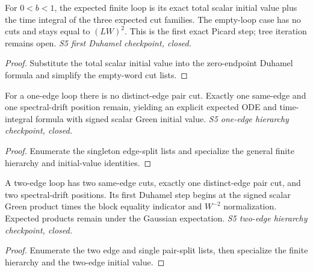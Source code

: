 \begin{lemma}
  \label{lem:loop-hierarchy-first-duhamel}
  \leanok
  For $0<b<1$, the expected finite loop is its exact total scalar initial
  value plus the time integral of the three expected cut families. The
  empty-loop case has no cuts and stays equal to $(LW)^2$. This is the
  first exact Picard step; tree iteration remains open.
  \emph{S5 first Duhamel checkpoint, closed.}
\end{lemma}
\begin{proof}\leanok
  Substitute the total scalar initial value into the zero-endpoint
  Duhamel formula and simplify the empty-word cut lists.
\end{proof}

\begin{lemma}
  \label{lem:loop-hierarchy-one-edge}
  \leanok
  For a one-edge loop there is no distinct-edge pair cut. Exactly one
  same-edge and one spectral-drift position remain, yielding an explicit
  expected ODE and time-integral formula with signed scalar Green initial
  value. \emph{S5 one-edge hierarchy checkpoint, closed.}
\end{lemma}
\begin{proof}\leanok
  Enumerate the singleton edge-split lists and specialize the general
  finite hierarchy and initial-value identities.
\end{proof}

\begin{lemma}
  \label{lem:loop-hierarchy-two-edge}
  \leanok
  A two-edge loop has two same-edge cuts, exactly one distinct-edge pair
  cut, and two spectral-drift positions. Its first Duhamel step begins at
  the signed scalar Green product times the block equality indicator and
  $W^{-2}$ normalization. Expected products remain under the Gaussian
  expectation. \emph{S5 two-edge hierarchy checkpoint, closed.}
\end{lemma}
\begin{proof}\leanok
  Enumerate the two edge and single pair-split lists, then specialize
  the finite hierarchy and the two-edge initial value.
\end{proof}

